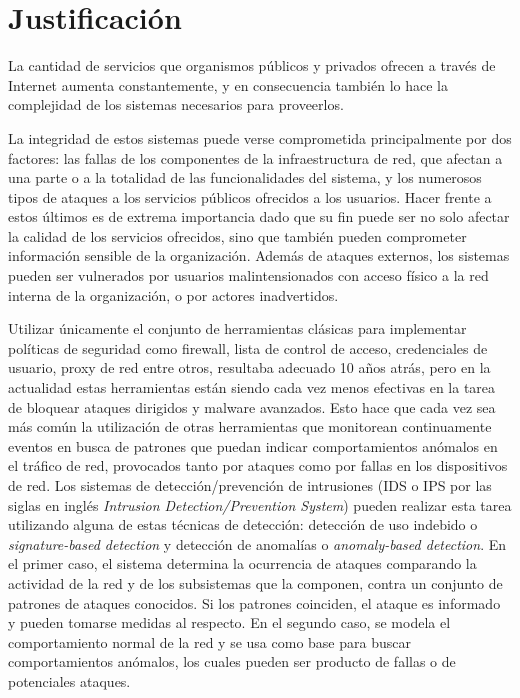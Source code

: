 \section*{Justificación}
La cantidad de servicios que organismos públicos y privados ofrecen a través de Internet aumenta constantemente, y en consecuencia también lo hace la complejidad de los sistemas necesarios para proveerlos. \par
La integridad de estos sistemas puede verse comprometida principalmente por dos factores: las fallas de los componentes de la infraestructura de red\cite{Gill:2011:UNF:2043164.2018477}, que afectan a una parte o a la totalidad de las funcionalidades del sistema, y los numerosos tipos de ataques\cite{Karumanchi:2014:WLS:2554850.2555010}\cite{mutchler15:mobilewebapps} a los servicios públicos ofrecidos a los usuarios. Hacer frente a estos últimos es de extrema importancia dado que su fin puede ser no solo afectar la calidad de los servicios ofrecidos, sino que también pueden comprometer información sensible de la organización. Además de ataques externos, los sistemas pueden ser vulnerados por usuarios malintensionados con acceso físico a la red interna de la organización, o por actores inadvertidos\cite{Kraemer2007143}\cite{Kraemer2009509}\cite{Liginlal2009215}\cite{Ahmed12humanerrors}. \par
Utilizar únicamente el conjunto de herramientas clásicas para implementar políticas de seguridad como firewall, lista de control de acceso, credenciales de usuario, proxy de red entre otros, resultaba adecuado 10 años atrás, pero en la actualidad estas herramientas están siendo cada vez menos efectivas en la tarea de bloquear ataques dirigidos y malware avanzados. Esto hace que cada vez sea más común la utilización de otras herramientas que monitorean continuamente eventos en busca de patrones que puedan indicar comportamientos anómalos en el tráfico de red, provocados tanto por ataques como por fallas en los dispositivos de red. Los sistemas de detección/prevención de intrusiones (IDS o IPS por las siglas en inglés \textit{Intrusion Detection/Prevention System}) pueden realizar esta tarea utilizando alguna de estas técnicas de detección: detección de uso indebido o \textit{signature-based detection} y detección de anomalías o \textit{anomaly-based detection}\cite{Milenkoski:2015:ECI:2808687.2808691}. En el primer caso, el sistema determina la ocurrencia de ataques comparando la actividad de la red y de los subsistemas que la componen, contra un conjunto de patrones de ataques conocidos. Si los patrones coinciden, el ataque es informado y pueden tomarse medidas al respecto. En el segundo caso, se modela el comportamiento normal de la red y se usa como base para buscar comportamientos anómalos, los cuales pueden ser producto de fallas o de potenciales ataques. \par
